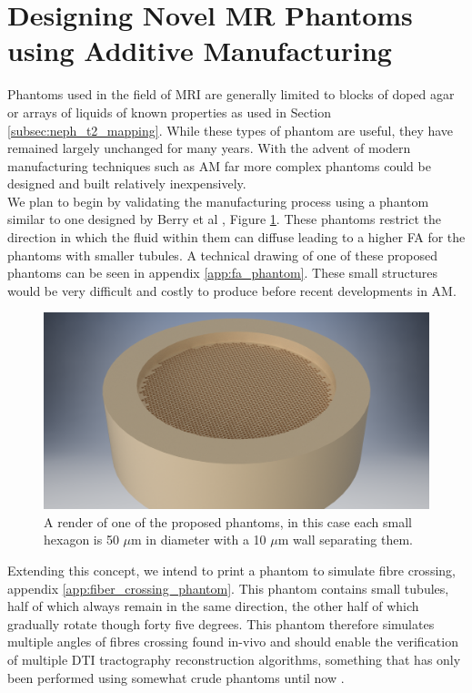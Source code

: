 \newpage
\section{Designing Novel MR Phantoms using Additive Manufacturing}

Phantoms used in the field of \ac{MRI} are generally limited to blocks of doped agar \cite{hattori_development_2013} or arrays of liquids of known properties as used in Section \ref{subsec:neph_t2_mapping}. While these types of phantom are useful, they have remained largely unchanged for many years. With the advent of modern manufacturing techniques such as \ac{AM} far more complex phantoms could be designed and built relatively inexpensively.\\

We plan to begin by validating the manufacturing process using a phantom similar to one designed by Berry et al \cite{berry_3d_2017}, Figure \ref{fig:am_hex_phantom}. These phantoms restrict the direction in which the fluid within them can diffuse leading to a higher \ac{FA} for the phantoms with smaller tubules. A technical drawing of one of these proposed phantoms can be seen in appendix \ref{app:fa_phantom}. These small structures would be very difficult and costly to produce before recent developments in \ac{AM}.

\begin{figure}[H]
	\centering
	\includegraphics[width=.7\textwidth]{Images/Other/AM/50um_Hexagonal_2.png}
	\caption{A render of one of the proposed phantoms, in this case each small hexagon is 50 $\mu$m in diameter with a 10 $\mu$m wall separating them.}
	\label{fig:am_hex_phantom}
\end{figure}

Extending this concept, we intend to print a phantom to simulate fibre crossing, appendix \ref{app:fiber_crossing_phantom}. This phantom contains small tubules, half of which always remain in the same direction, the other half of which gradually rotate though forty five degrees. This phantom therefore simulates multiple angles of fibres crossing found in-vivo and should enable the verification of multiple \ac{DTI} tractography reconstruction algorithms, something that has only been performed using somewhat crude phantoms until now \cite{perrin_validation_2005}.\\

